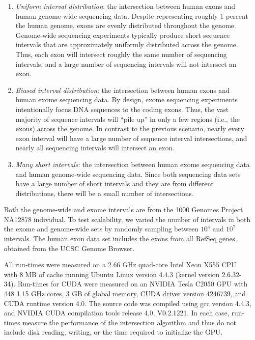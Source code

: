 \documentclass{bioinfo}
\begin{document}
		\begin{enumerate}
			\item
			{\em Uniform interval distribution}: the intersection between human
			exons and human genome-wide sequencing data.  Despite representing roughly 1
			percent the human genome, exons are evenly distributed throughout the genome.
			Genome-wide sequencing experiments typically produce short sequence intervals
			that are approximately uniformly distributed across the genome. Thus, each exon
			will intersect roughly the same number of sequencing intervals, and a large
			number of sequencing intervals will not intersect an exon.

			\item
			{\em Biased interval distribution}:  the intersection between human
			exons and human exome sequencing data.  By design, exome sequencing experiments
			intentionally focus DNA sequences to the coding exons.  Thus, the vast majority
			of sequence intervals will ``pile up'' in only a few regions (i.e., the exons)
			across the genome. In contrast to the previous scenario, nearly every exon
			interval will have a large number of sequence interval intersections, and nearly
			all sequencing intervals will intersect an exon.

			\item
			{\em Many short intervals}: the intersection between human exome
			sequencing data and human genome-wide sequencing data.  Since both sequencing
			data sets have a large number of short intervals and they are from different
			distributions, there will be a small number of intersections.
		\end{enumerate}

		Both the genome-wide and exome intervals are from the 1000 Genomes Project
		NA12878 individual.  To test scalability, we varied the number of intervals in
		both the exome and genome-wide sets by randomly sampling between $10^4$ and
		$10^7$ intervals.  The human exon data set includes the exons from all RefSeq
		genes, obtained from the UCSC Genome Browser. 

		All run-times were measured on a 2.66 GHz quad-core Intel Xeon X555 CPU with 8
		MB of cache running Ubuntu Linux version 4.4.3 (kernel version 2.6.32-34).
		Run-times for CUDA were measured on an NVIDIA Tesla C2050 GPU with 448 1.15 GHz
		cores, 3 GB of global memory, CUDA driver version 4246739, and CUDA runtime
		version 4.0.  The source code was compiled using gcc version 4.4.3, and NVIDIA
		CUDA compilation tools release 4.0, V0.2.1221.  In each case, run-times measure 
		the performance of the intersection algorithm and thus do not include disk
		reading, writing, or the time required to initialize the GPU.
\end{document}

